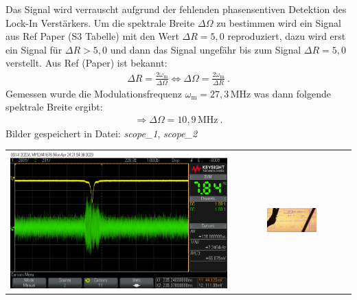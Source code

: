 Das Signal wird verrauscht aufgrund der fehlenden phasensentiven Detektion des Lock-In Verstärkers. Um die spektrale Breite $\Delta \Omega$ zu bestimmen wird ein Signal aus Ref Paper (S3 Tabelle) mit den Wert $\Delta R = 5,0$ reproduziert, dazu wird erst ein Signal für $\Delta R > 5,0$ und dann das Signal ungefähr bis zum Signal  $\Delta R = 5,0$ verstellt. Aus Ref (Paper) ist bekannt:
\begin{gather}
    \Delta R = \frac{2 \omega_\mathrm{m}}{\Delta \Omega} \Leftrightarrow \Delta \Omega = \frac{2 \omega_\mathrm{m}}{\Delta R}~.
\end{gather}
Gemessen wurde die Modulationsfrequenz $\omega_\mathrm{m} = 27,3$\,MHz was dann folgende spektrale Breite ergibt: 
\begin{gather}    
    \Rightarrow \boxed{\Delta \Omega = 10,9\,\mathrm{MHz}}~.
\end{gather}
Bilder gespeichert in Datei: \textit{scope\_1}, \textit{scope\_2}

\begin{center}
    \captionsetup{type=figure}
    \begin{tabular}{c c}
        \includegraphics[scale=0.25]{Bilder/Signal-Rausch/scope_2.png} & \includegraphics[width=0.45\textwidth]{Bilder/Signal-Rausch/signal-rausch_paper_hf-generator.jpg}
    \end{tabular}
    \label{fig:specBreite}
\end{center}

